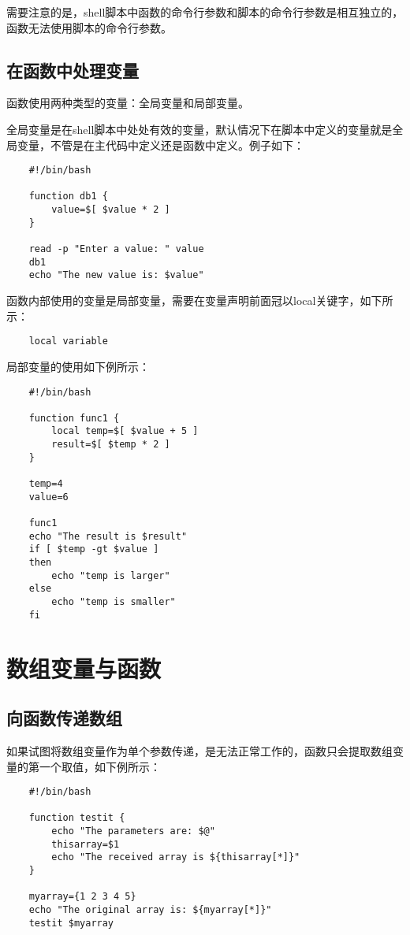 \documentclass[a4paper,left=2.5cm,right=2.5cm,11pt]{article}
\begin{document}
	需要注意的是，shell脚本中函数的命令行参数和脚本的命令行参数是相互独立的，函数无法使用脚本的命令行参数。

\subsection{在函数中处理变量}
	函数使用两种类型的变量：全局变量和局部变量。\par
	全局变量是在shell脚本中处处有效的变量，默认情况下在脚本中定义的变量就是全局变量，不管是在主代码中定义还是函数中定义。例子如下：
	\begin{lstlisting}
	#!/bin/bash

	function db1 {
		value=$[ $value * 2 ]
	}

	read -p "Enter a value: " value
	db1
	echo "The new value is: $value"
	\end{lstlisting}

	函数内部使用的变量是局部变量，需要在变量声明前面冠以local关键字，如下所示：
	\begin{lstlisting}
	local variable
	\end{lstlisting}

	局部变量的使用如下例所示：
	\begin{lstlisting}
	#!/bin/bash

	function func1 {
		local temp=$[ $value + 5 ]
		result=$[ $temp * 2 ]
	}

	temp=4
	value=6

	func1
	echo "The result is $result"
	if [ $temp -gt $value ]
	then
		echo "temp is larger"
	else
		echo "temp is smaller"
	fi
	\end{lstlisting}

\section{数组变量与函数}
\subsection{向函数传递数组}
	如果试图将数组变量作为单个参数传递，是无法正常工作的，函数只会提取数组变量的第一个取值，如下例所示：
	\begin{lstlisting}
	#!/bin/bash

	function testit {
		echo "The parameters are: $@"
		thisarray=$1
		echo "The received array is ${thisarray[*]}"
	}

	myarray={1 2 3 4 5}
	echo "The original array is: ${myarray[*]}"
	testit $myarray
	\end{lstlisting}
\end{document}
